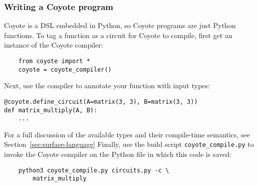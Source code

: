 \subsubsection{Writing a Coyote program}
Coyote is a DSL embedded in Python, so Coyote programs are just Python functions. To tag a function as a circuit for Coyote to compile, first get an instance of the Coyote compiler:
\begin{verbatim}
    from coyote import *
    coyote = coyote_compiler()
\end{verbatim}
Next, use the compiler to annotate your function with input types:
\begin{verbatim}
@coyote.define_circuit(A=matrix(3, 3), B=matrix(3, 3))
def matrix_multiply(A, B):
    ...
\end{verbatim}
For a full discussion of the available types and their compile-time semantics, see Section~\ref{sec:surface-language}
Finally, use the build script {\tt coyote\_compile.py} to invoke the Coyote compiler on the Python file in which this code is saved:
\begin{verbatim}
    python3 coyote_compile.py circuits.py -c \
        matrix_multiply
\end{verbatim}
